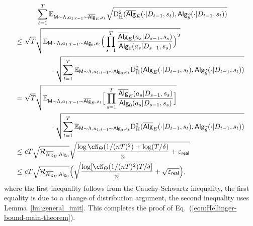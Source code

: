 \documentclass[10pt]{article}
\renewcommand{\epsilon}{\varepsilon}
\newcommand{\<}{\left\langle}
\renewcommand{\>}{\right\rangle}
\newcommand{\E}{\mathbb{E}}
\newcommand{\inst}{{\mathsf{M}}}
\newcommand{\HelDs}{{\mathrm{D}^2_{\mathrm{H}}}}
\newcommand{\state}{{s}}
\newcommand{\action}{{a}}
\newcommand{\totlen}{{T}}
\newcommand{\sAlg}{{\mathsf{Alg}}}
\newcommand{\osAlg}{\overline{\mathsf{Alg}}}
\newcommand{\dset}{{D}}
\newcommand{\Numobs}{{n}}
\newcommand{\Parspace}{{\Theta}}
\newcommand{\EstPar}{{\widehat{\theta}}}
\newcommand{\prior}{{\Lambda}}
\newcommand{\shortexp}{{E}}
\newcommand{\geneps}{{\epsilon}_{\sf real}}
\newcommand{\distratio}{{\mathcal{R}}}
\begin{document}
\begin{align*}
&\qquad
\sum_{t=1}^\totlen\E_{\inst\sim\prior,\action_{1:t-1}\sim\osAlg_\shortexp,\state_t}\sqrt{\HelDs(\osAlg_{\shortexp}(\cdot|\dset_{t-1},\state_t),\sAlg_{\EstPar}(\cdot|\dset_{t-1},\state_t))}\\
\leq&~
\sqrt{\totlen}\sqrt{\E_{\inst\sim\prior,\action_{1:\totlen-1}\sim\sAlg_0,\state_t}
\Big(\prod_{s=1}^{\totlen}\frac{\osAlg_\shortexp(\action_s|\dset_{s-1},\state_s)}{\sAlg_0(\action_s|\dset_{s-1},\state_s)}\Big)^2}
\\
&\qquad\qquad\cdot\sqrt{\sum_{t=1}^\totlen{\E_{\inst\sim\prior,\action_{1:t-1}\sim\sAlg_0,\state_t}\HelDs(\osAlg_{\shortexp}(\cdot|\dset_{t-1},\state_t),\sAlg_{\EstPar}(\cdot|\dset_{t-1},\state_t))}}\\
=&~
\sqrt{\totlen}\sqrt{\E_{\inst\sim\prior,\action_{1:\totlen-1}\sim\osAlg_\shortexp,\state_t}
\Big[\prod_{s=1}^{\totlen}\frac{\osAlg_\shortexp(\action_s|\dset_{s-1},\state_s)}{\sAlg_0(\action_s|\dset_{s-1},\state_s)}\Big]}
\\
&\qquad\qquad\cdot\sqrt{\sum_{t=1}^\totlen{\E_{\inst\sim\prior,\action_{1:t-1}\sim\sAlg_0,\state_t}\HelDs(\osAlg_{\shortexp}(\cdot|\dset_{t-1},\state_t),\sAlg_{\EstPar}(\cdot|\dset_{t-1},\state_t))}}
\\
\leq&~
c{\totlen}\sqrt{\distratio_{\osAlg_\shortexp,\sAlg_0}}
\sqrt{\frac{\log \cN_{\Parspace}(1/(\Numobs\totlen)^2)+\log(\totlen/\delta)}{n}+\geneps}\\
\leq&~ c
{\totlen}\sqrt{\distratio_{\osAlg_\shortexp,\sAlg_0}}
\Big(\sqrt{\frac{\log [\cN_{\Parspace}(1/(\Numobs\totlen)^2)\totlen/\delta]}{n}}+\sqrt{\geneps}\Big),
\end{align*}
where the first inequality follows from the Cauchy-Schwartz inequality, the first equality is due to a change of distribution argument, the second inequality uses Lemma~\ref{lm:general_imit}. This completes the proof of Eq.~(\ref{eqn:Hellinger-bound-main-theorem}).
\end{document}
